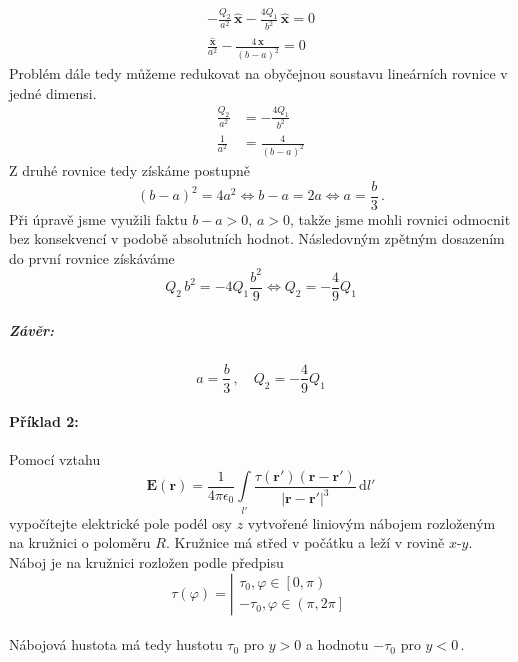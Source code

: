 \documentclass{article}
\let\oldhat\hat
\renewcommand{\hat}[1]{\oldhat{\mathbf{#1}}}
\newcommand{\vecvar}[1]{\boldsymbol{#1}}
\begin{document}
		\begin{align*}
			- \frac{Q_2}{a^2} \, \hat{x} - \frac{4Q_1}{b^2} \, \hat{x} = 0 \\
			\frac{\hat{x}}{a^2} - \frac{4 \, \hat{x}}{(b-a)^2} = 0
		\end{align*}
		Problém dále tedy můžeme redukovat na obyčejnou soustavu lineárních rovnice v jedné dimensi.
		\begin{align*}
			\frac{Q_2}{a^2} &= - \frac{4Q_1}{b^2} \\
			\frac{1}{a^2} &= \frac{4}{(b-a)^2}
		\end{align*}
		Z druhé rovnice tedy získáme postupně
		\begin{equation*}
			(b-a)^2 = 4 a^2 \iff b-a = 2 a \iff a = \frac{b}{3} \, .
		\end{equation*}
		Při úpravě jsme využili faktu $b-a>0, \, a>0$, takže jsme mohli rovnici odmocnit bez konsekvencí v podobě absolutních hodnot. Následovným zpětným dosazením do první rovnice získáváme
		\begin{equation*}
			Q_2 \, b^2 = -4 Q_1 \frac{b^2}{9} \iff Q_2 = - \frac{4}{9} Q_1
		\end{equation*}
	
	\subparagraph{Závěr:}
		\begin{equation*}
			a = \frac{b}{3} \, , \quad Q_2 = -\frac{4}{9} Q_1
		\end{equation*}
	\newpage
			
	\paragraph{Příklad 2:}
		Pomocí vztahu
		\begin{equation*}
			\vecvar{E(r)} = \frac{1}{4 \pi \epsilon_0} \int\limits_{l'} \frac{\tau(\vecvar{r'}) (\vecvar{r - r'})}{|\vecvar{r - r'}|^3} \, \mathrm{d}l'
		\end{equation*}
		vypočítejte elektrické pole podél osy $z$ vytvořené liniovým nábojem  rozloženým na kružnici o poloměru $R$. Kružnice má střed v počátku a leží v rovině $x$-$y$. Náboj je na kružnici rozložen podle předpisu
		\[ \tau(\varphi) = \left| \begin{matrix}
			\tau_0, \varphi \in \left[ 0, \pi \right) \\
			-\tau_0, \varphi \in \left( \pi, 2 \pi \right]
		\end{matrix} \right. \] \\
		Nábojová hustota má tedy hustotu $\tau_0$ pro $y > 0$ a hodnotu $-\tau_0$ pro $y < 0 \, .$
		
\end{document}
